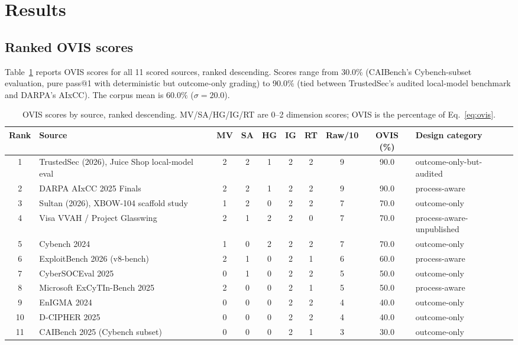 \documentclass[10pt,twocolumn]{article}
\begin{document}
\section{Results}
\label{sec:results}

\subsection{Ranked OVIS scores}
Table~\ref{tab:ovis} reports OVIS scores for all 11 scored sources,
ranked descending. Scores range from 30.0\% (CAIBench's Cybench-subset
evaluation, pure pass@1 with deterministic but outcome-only grading) to
90.0\% (tied between TrustedSec's audited local-model benchmark and
DARPA's AIxCC). The corpus mean is $60.0\%$ ($\sigma = 20.0$).

\begin{table}[t]
\centering
\small
\caption{OVIS scores by source, ranked descending. MV/SA/HG/IG/RT are 0--2 dimension scores; OVIS is the percentage of Eq.~\ref{eq:ovis}.}
\label{tab:ovis}
\begin{tabular}{clcccccccl}
\toprule
Rank & Source & MV & SA & HG & IG & RT & Raw/10 & OVIS (\%) & Design category \\
\midrule
1 & TrustedSec (2026), Juice Shop local-model eval~\cite{trustedsec2026} & 2 & 2 & 1 & 2 & 2 & 9 & 90.0 & outcome-only-but-audited \\
2 & DARPA AIxCC 2025 Finals~\cite{aixcc2025} & 2 & 2 & 1 & 2 & 2 & 9 & 90.0 & process-aware \\
3 & Sultan (2026), XBOW-104 scaffold study~\cite{xbow2026} & 1 & 2 & 0 & 2 & 2 & 7 & 70.0 & outcome-only \\
4 & Visa VVAH / Project Glasswing~\cite{visavvah2026} & 2 & 1 & 2 & 2 & 0 & 7 & 70.0 & process-aware-unpublished \\
5 & Cybench 2024~\cite{cybench2024} & 1 & 0 & 2 & 2 & 2 & 7 & 70.0 & outcome-only \\
6 & ExploitBench 2026 (v8-bench)~\cite{exploitbench2026} & 2 & 1 & 0 & 2 & 1 & 6 & 60.0 & process-aware \\
7 & CyberSOCEval 2025~\cite{cybersoceval2025} & 0 & 1 & 0 & 2 & 2 & 5 & 50.0 & outcome-only \\
8 & Microsoft ExCyTIn-Bench 2025~\cite{excytin2025} & 2 & 0 & 0 & 2 & 1 & 5 & 50.0 & process-aware \\
9 & EnIGMA 2024~\cite{enigma2024} & 0 & 0 & 0 & 2 & 2 & 4 & 40.0 & outcome-only \\
10 & D-CIPHER 2025~\cite{dcipher2025} & 0 & 0 & 0 & 2 & 2 & 4 & 40.0 & outcome-only \\
11 & CAIBench 2025 (Cybench subset)~\cite{caibench2025} & 0 & 0 & 0 & 2 & 1 & 3 & 30.0 & outcome-only \\
\bottomrule
\end{tabular}
\end{table}
\end{document}
